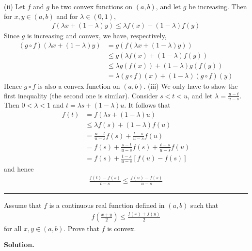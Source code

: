 \documentclass[12pt]{article}
\theoremstyle{definition}
\begin{document}
(ii) Let $f$ and $g$ be two convex functions on $(a,b)$, and let $g$ be increasing. Then for $x,y\in(a,b)$ and for $\lambda\in(0,1)$,
\begin{align*}
f(\lambda x+(1-\lambda)y)\le\lambda f(x)+(1-\lambda)f(y)
\end{align*}
Since $g$ is increasing and convex, we have, respectively,
\begin{align*}
(g\circ f)(\lambda x+(1-\lambda)y)
&=g(f(\lambda x+(1-\lambda)y)) \\
&\le g(\lambda f(x)+(1-\lambda)f(y)) \\
&\le\lambda g(f(x))+(1-\lambda)g(f(y)) \\
&=\lambda (g\circ f)(x)+(1-\lambda)(g\circ f)(y)
\end{align*}
Hence $g\circ f$ is also a convex function on $(a,b)$.
(iii) We only have to show the first inequality (the second one is similar). Consider $s<t<u$, and let $\lambda=\frac{u-t}{u-s}$. Then $0<\lambda<1$ and $t=\lambda s+(1-\lambda)u$. It follows that
\begin{align*}
f(t)
&=f(\lambda s+(1-\lambda)u) \\
&\le\lambda f(s)+(1-\lambda)f(u) \\
&=\frac{u-t}{u-s}f(s)+\frac{t-s}{u-s}f(u) \\
&=f(s)+\frac{s-t}{u-s}f(s)+\frac{t-s}{u-s}f(u) \\
&=f(s)+\frac{t-s}{u-s}\left[f(u)-f(s)\right]
\end{align*}
and hence
\begin{align*}
\frac{f(t)-f(s)}{t-s}\le\frac{f(u)-f(s)}{u-s}
\end{align*}



\bigskip\noindent\hrule\bigskip

Assume that $f$ is a continuous real function defined in $(a,b)$ such that
\begin{align*}
f\left(\frac{x+y}{2}\right)\le\frac{f(x)+f(y)}{2}
\end{align*}
for all $x,y\in(a,b)$. Prove that $f$ is convex.

\smallskip
\noindent\textbf{Solution.}\quad
\end{document}
